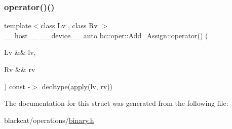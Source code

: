 \mbox{\label{structbc_1_1oper_1_1Add__Assign_a40d7c53569de0b79f9548b16b21c0b09}} 
\subsubsection{\texorpdfstring{operator()()}{operator()()}}
{\footnotesize\ttfamily template$<$class Lv , class Rv $>$ \\
\+\_\+\+\_\+host\+\_\+\+\_\+ \+\_\+\+\_\+device\+\_\+\+\_\+ auto bc\+::oper\+::\+Add\+\_\+\+Assign\+::operator() (\begin{DoxyParamCaption}\item[{Lv \&\&}]{lv,  }\item[{Rv \&\&}]{rv }\end{DoxyParamCaption}) const -\/$>$ decltype(\hyperlink{structbc_1_1oper_1_1Add__Assign_ac908f04769926c30ab8763d5748dee4b}{apply}(lv, rv)) \hspace{0.3cm}{\ttfamily [inline]}}



The documentation for this struct was generated from the following file\+:\begin{DoxyCompactItemize}
\item 
blackcat/operations/\hyperlink{binary_8h}{binary.\+h}\end{DoxyCompactItemize}
